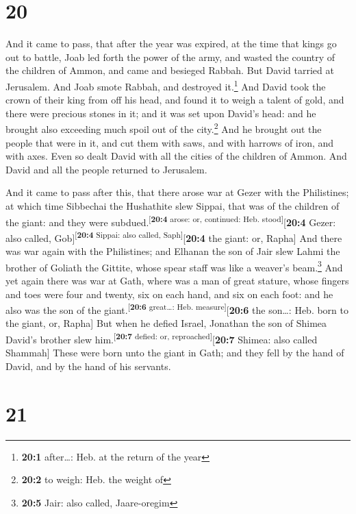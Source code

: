 \hypertarget{section-19}{%
\section{20}\label{section-19}}

 And it came to pass, that after the year was expired, at
the time that kings go out to battle, Joab led forth the power of the
army, and wasted the country of the children of Ammon, and came and
besieged Rabbah. But David tarried at Jerusalem. And Joab smote Rabbah,
and destroyed it.\footnote{\textbf{20:1} after\ldots: Heb. at the return
  of the year}  And David took the crown of their king
from off his head, and found it to weigh a talent of gold, and there
were precious stones in it; and it was set upon David's head: and he
brought also exceeding much spoil out of the city.\footnote{\textbf{20:2}
  to weigh: Heb. the weight of}  And he brought out the
people that were in it, and cut them with saws, and with harrows of
iron, and with axes. Even so dealt David with all the cities of the
children of Ammon. And David and all the people returned to Jerusalem.

 And it came to pass after this, that there arose war at
Gezer with the Philistines; at which time Sibbechai the Hushathite slew
Sippai, that was of the children of the giant: and they were
subdued.\textsuperscript{{[}\textbf{20:4} arose: or, continued: Heb.
stood{]}}{[}\textbf{20:4} Gezer: also called,
Gob{]}\textsuperscript{{[}\textbf{20:4} Sippai: also called,
Saph{]}}{[}\textbf{20:4} the giant: or, Rapha{]}  And
there was war again with the Philistines; and Elhanan the son of Jair
slew Lahmi the brother of Goliath the Gittite, whose spear staff was
like a weaver's beam.\footnote{\textbf{20:5} Jair: also called,
  Jaare-oregim}  And yet again there was war at Gath,
where was a man of great stature, whose fingers and toes were four and
twenty, six on each hand, and six on each foot: and he also was the son
of the giant.\textsuperscript{{[}\textbf{20:6} great\ldots: Heb.
measure{]}}{[}\textbf{20:6} the son\ldots: Heb. born to the giant, or,
Rapha{]}  But when he defied Israel, Jonathan the son of
Shimea David's brother slew him.\textsuperscript{{[}\textbf{20:7}
defied: or, reproached{]}}{[}\textbf{20:7} Shimea: also called
Shammah{]}  These were born unto the giant in Gath; and
they fell by the hand of David, and by the hand of his servants.

\hypertarget{section-20}{%
\section{21}\label{section-20}}


